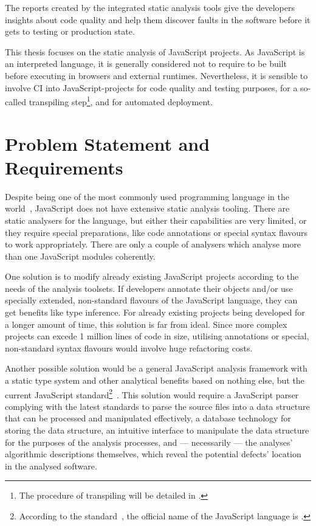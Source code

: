 The reports created by the integrated static analysis tools give the developers insights about code quality and help them discover faults in the software before it gets to testing or production state.

This thesis focuses on the static analysis of JavaScript projects. As JavaScript is an interpreted language, it is generally considered not to require to be built before executing in browsers and external runtimes. Nevertheless, it is sensible to involve CI into JavaScript-projects for code quality and testing purposes, for a so-called transpiling step\footnote{The procedure of transpiling will be detailed in .}, and for automated deployment.


\section{Problem Statement and Requirements}

Despite being one of the most commonly used programming language in the world~\cite{javascriptstackoverflow}, JavaScript does not have extensive static analysis tooling. There are static analysers for the language, but either their capabilities are very limited, or they require special preparations, like code annotations or special syntax flavours to work appropriately. There are only a couple of analysers which analyse more than one JavaScript modules coherently.

One solution is to modify already existing JavaScript projects according to the needs of the analysis toolsets. If developers annotate their objects and/or use specially extended, non-standard flavours of the JavaScript language, they can get benefits like type inference. For already existing projects being developed for a longer amount of time, this solution is far from ideal. Since more complex projects can excede 1 million lines of code in size, utilising annotations or special, non-standard syntax flavours would involve huge refactoring costs.

Another possible solution would be a general JavaScript analysis framework with a static type system and other analytical benefits based on nothing else, but the current JavaScript standard\footnote{According to the standard~\cite{ecmascriptstandard}, the official name of the JavaScript language is \es.}~\cite{ecmascriptstandard}. This solution would require a JavaScript parser complying with the latest \es standards to parse the source files into a data structure that can be processed and manipulated effectively, a database technology for storing the data structure, an intuitive interface to manipulate the data structure for the purposes of the analysis processes, and — necessarily — the analyses' algorithmic descriptions themselves, which reveal the potential defects' location in the analysed software.


